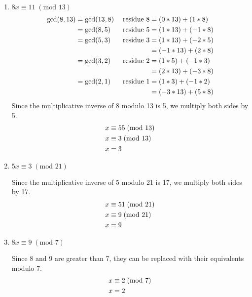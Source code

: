 \documentclass[11pt]{article}
\begin{document}
\begin{enumerate}[label=(\alph*)]
\item $8x \equiv 11\; (\textrm{mod } 13)$
\begin{alignat}{2}
	\textrm{gcd}(8, 13) &= \textrm{gcd}(13, 8)\; &\textrm{residue } 8 &= (0 * 13) + (1 * 8) \notag
	\\
	&= \textrm{gcd}(8, 5)\; &\textrm{residue } 5 &= (1 * 13) + (-1 * 8) \notag
	\\		
	&= \textrm{gcd}(5, 3)\; &\textrm{residue } 3 &= (1 * 13) + (-2 * 5) \notag
	\\
	&&&= (-1 * 13) + (2 * 8) \notag
	\\
	&= \textrm{gcd}(3, 2)\; &\textrm{residue } 2 &= (1 * 5) + (-1 * 3) \notag
	\\
	&&&= (2 * 13) + (-3 * 8) \notag
	\\
	&= \textrm{gcd}(2, 1)\; &\textrm{residue } 1 &= (1 * 3) + (-1 * 2) \notag
	\\
	&&&= (-3 * 13) + (5 * 8) \notag
\end{alignat}
Since the multiplicative inverse of 8 modulo 13 is 5, we multiply both sides by 5.
\begin{alignat}{1}
	x &\equiv 55\; (\textrm{mod } 13) \notag
	\\
	x &\equiv 3\; (\textrm{mod } 13) \notag
	\\
	x &= 3 \notag
\end{alignat}

\item $5x \equiv 3\; (\textrm{mod } 21)$

Since the multiplicative inverse of 5 modulo 21 is 17, we multiply both sides by 17.
\begin{alignat}{1}
	x &\equiv 51\; (\textrm{mod } 21) \notag
	\\
	x &\equiv 9\; (\textrm{mod } 21) \notag
	\\
	x &= 9 \notag
\end{alignat}

\item $8x \equiv 9\; (\textrm{mod } 7)$

Since 8 and 9 are greater than 7, they can be replaced with their equivalents modulo 7.
\begin{alignat}{1}
	x &\equiv 2\; (\textrm{mod } 7) \notag
	\\
	x &= 2 \notag
\end{alignat}

\end{enumerate}
\end{document}
